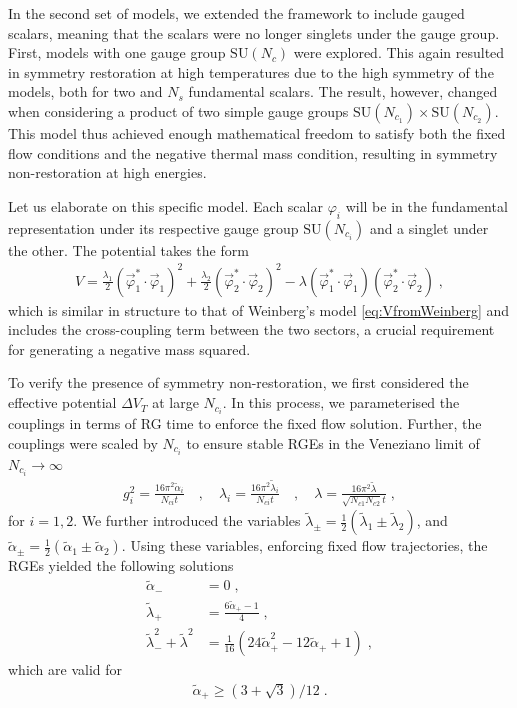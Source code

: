 In the second set of models, we extended the framework to include gauged scalars, meaning that the scalars were no longer singlets under the gauge group. First, models with one gauge group $ \mathrm{SU}(N_{c})$ were explored. This again resulted in symmetry restoration at high temperatures due to the high symmetry of the models, both for two and $N_s$ fundamental scalars. The result, however, changed when considering a product of two simple gauge groups $\mathrm{SU}(N_{c_1})\times\mathrm{SU}(N_{c_2})$. This model thus achieved enough mathematical freedom to satisfy both the fixed flow conditions and the negative thermal mass condition, resulting in symmetry non-restoration at high energies. 

Let us elaborate on this specific model. Each scalar $\varphi_i$ will be in the fundamental representation under its respective gauge group $\mathrm{SU}(N_{c_i})$ and a singlet under the other. The potential takes the form
\begin{align}
    V=\frac{\lambda_1}{2}\left(\vec{\varphi}_1^*\cdot\vec{\varphi}_1\right)^2+\frac{\lambda_2}{2}\left(\vec{\varphi}_2^*\cdot\vec{\varphi}_2\right)^2-
\lambda\left(\vec{\varphi}_1^*\cdot\vec{\varphi}_1\right)\left(\vec{\varphi}_2^*\cdot\vec{\varphi}_2\right)\;,
\end{align}
which is similar in structure to that of Weinberg's model \eqref{eq:VfromWeinberg} and includes the cross-coupling term between the two sectors, a crucial requirement for generating a negative mass squared.

To verify the presence of symmetry non-restoration, we first considered the effective potential $\Delta V_T$ at large $N_{c_i}$. In this process, we parameterised the couplings in terms of RG time to enforce the fixed flow solution. Further, the couplings were scaled by $N_{c_i}$ to ensure stable RGEs in the Veneziano limit of $N_{c_i}\to \infty$
\begin{align}
    g_i^2=\frac{16\pi^2\tilde\alpha_i}{N_{ci}t}\quad,\quad \lambda_i=\frac{16\pi^2\tilde\lambda_i}{N_{ci}t}\quad,\quad\lambda=\frac{16\pi^2\tilde\lambda}{\sqrt{N_{c1}N_{c2}}t}\;,
\end{align}
for $i=1,2$. We further introduced the variables $\tilde\lambda_\pm=\frac{1}{2}\left(\tilde\lambda_1\pm\tilde\lambda_2\right)$, and $\tilde\alpha_\pm=\frac{1}{2}\left(\tilde\alpha_1\pm\tilde\alpha_2\right)$. Using these variables, enforcing fixed flow trajectories, the RGEs yielded the following solutions
\begin{align}\label{eq:LO_sol}
    \tilde\alpha_-&=0 \;,\nonumber\\
\tilde\lambda_+&=\frac{6\tilde\alpha_+-1}{4}\;,\\
\tilde\lambda_-^2+\tilde\lambda^2&=\frac{1}{16}\left(24\tilde\alpha_+^2-12\tilde\alpha_++1\right)\;,\nonumber
\end{align}
which are valid for
\begin{align}
    \tilde\alpha_+\geq(3+\sqrt{3})/12\;.
\end{align}

